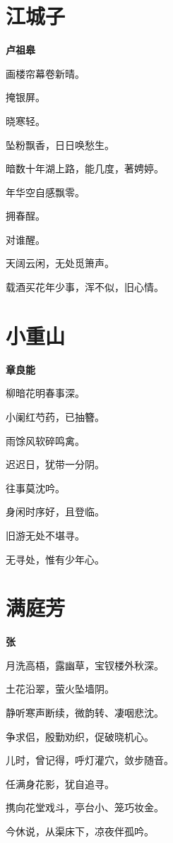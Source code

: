 \documentclass[12pt,a4paper]{ctexbook}
\begin{document}
\section{江城子}
\textbf{卢祖皋}\par\vspace{0.5em}
画楼帘幕卷新晴。\par
掩银屏。\par
晓寒轻。\par
坠粉飘香，日日唤愁生。\par
暗数十年湖上路，能几度，著娉婷。\par
年华空自感飘零。\par
拥春酲。\par
对谁醒。\par
天阔云闲，无处觅箫声。\par
载酒买花年少事，浑不似，旧心情。\par

\section{小重山}
\textbf{章良能}\par\vspace{0.5em}
柳暗花明春事深。\par
小阑红芍药，已抽簪。\par
雨馀风软碎鸣禽。\par
迟迟日，犹带一分阴。\par
往事莫沈吟。\par
身闲时序好，且登临。\par
旧游无处不堪寻。\par
无寻处，惟有少年心。\par

\section{满庭芳}
\textbf{张}\par\vspace{0.5em}
月洗高梧，露幽草，宝钗楼外秋深。\par
土花沿翠，萤火坠墙阴。\par
静听寒声断续，微韵转、凄咽悲沈。\par
争求侣，殷勤劝织，促破晓机心。\par
儿时，曾记得，呼灯灌穴，敛步随音。\par
任满身花影，犹自追寻。\par
携向花堂戏斗，亭台小、笼巧妆金。\par
今休说，从渠床下，凉夜伴孤吟。\par
\end{document}
